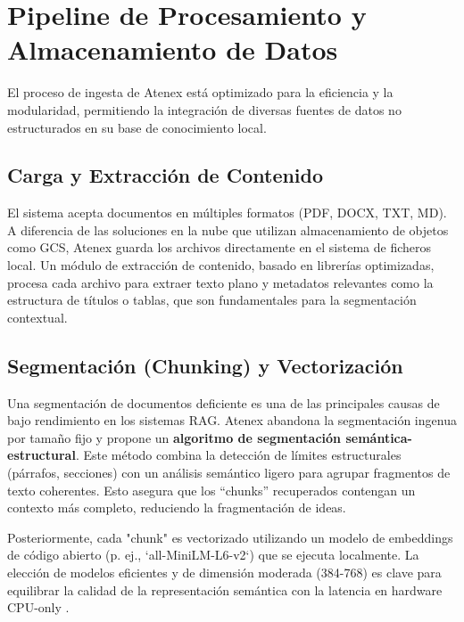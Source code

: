 \section{Pipeline de Procesamiento y Almacenamiento de Datos}

El proceso de ingesta de Atenex está optimizado para la eficiencia y la modularidad, permitiendo la integración de diversas fuentes de datos no estructurados en su base de conocimiento local.

\subsection{Carga y Extracción de Contenido}
El sistema acepta documentos en múltiples formatos (PDF, DOCX, TXT, MD). A diferencia de las soluciones en la nube que utilizan almacenamiento de objetos como GCS, Atenex guarda los archivos directamente en el sistema de ficheros local. Un módulo de extracción de contenido, basado en librerías optimizadas, procesa cada archivo para extraer texto plano y metadatos relevantes como la estructura de títulos o tablas, que son fundamentales para la segmentación contextual.

\subsection{Segmentación (Chunking) y Vectorización}
Una segmentación de documentos deficiente es una de las principales causas de bajo rendimiento en los sistemas RAG. Atenex abandona la segmentación ingenua por tamaño fijo y propone un \textbf{algoritmo de segmentación semántica-estructural}. Este método combina la detección de límites estructurales (párrafos, secciones) con un análisis semántico ligero para agrupar fragmentos de texto coherentes. Esto asegura que los ``chunks'' recuperados contengan un contexto más completo, reduciendo la fragmentación de ideas.

Posteriormente, cada "chunk" es vectorizado utilizando un modelo de embeddings de código abierto (p. ej., `all-MiniLM-L6-v2`) que se ejecuta localmente. La elección de modelos eficientes y de dimensión moderada (384-768) es clave para equilibrar la calidad de la representación semántica con la latencia en hardware CPU-only \cite{Tyndall2025OfflineRAG}.


